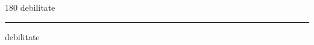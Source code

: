 
\begin{frame}
\begin{center}
\begin{turn}{180}
{\fontsize{2.5cm}{1em}\selectfont debilitate}
\end{turn}
\vspace{1em}\par  
\hrule
\vspace{1em}\par  
{\fontsize{2.5cm}{1em}\selectfont debilitate}
\end{center}
\end{frame}
